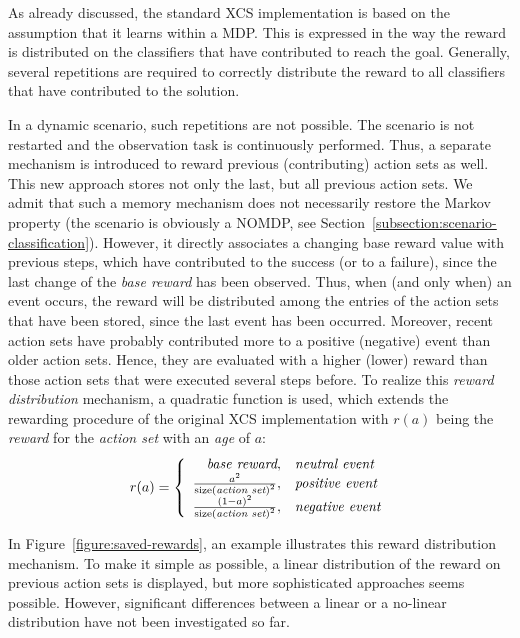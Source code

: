 As already discussed, the standard XCS implementation is based on the assumption that it learns within a MDP. This is expressed in the way the reward is distributed on the classifiers that have contributed to reach the goal. Generally, several repetitions are required to correctly distribute the reward to all classifiers that have contributed to the solution.

In a dynamic scenario, such repetitions are not possible. The scenario is not restarted and the observation task is continuously performed. Thus, a separate mechanism is introduced to reward previous (contributing) action sets as well. This new approach stores not only the last, but all previous action sets. We admit that such a memory mechanism does not necessarily restore the Markov property (the scenario is obviously a NOMDP, see Section~\ref{subsection:scenario-classification}). However, it directly associates a changing base reward value with previous steps, which have contributed to the success (or to a failure), since the last change of the \emph{base reward} has been observed. %
Thus, when (and only when) an event occurs, the reward will be distributed among the entries of the action sets that have been stored, since the last event has been occurred. Moreover, recent action sets have probably contributed more to a positive (negative) event than older action sets. Hence, they are evaluated with a higher (lower) reward than those action sets that were executed several steps before. To realize this \emph{reward distribution} mechanism, a quadratic function is used, which extends the rewarding procedure of the original XCS implementation with $r(a)$ being the \emph{reward} for the \emph{action set} with an \emph{age} of $a$:
$$ %
	r(a) = 
	\left\{ \begin{array}{r@{,\quad}l}
		\emph{base reward} & \mbox{\emph{neutral event}}\\  	
		\frac{{a}^{2}}{{\mathrm{size(\emph{action set})}}^{2}} & \mbox{\emph{positive event}} \\
  		\frac{{(1 - a)}^{2}}{{\mathrm{size(\emph{action set})}}^{2}} & \mbox{\emph{negative event}}
  	\end{array} \right.
$$ %

In Figure~\ref{figure:saved-rewards}, an example illustrates this reward distribution mechanism. To make it simple as possible, a linear distribution of the reward on previous action sets is displayed, but more sophisticated approaches seems possible. However, significant differences between a linear or a no-linear distribution have not been investigated so far. 

